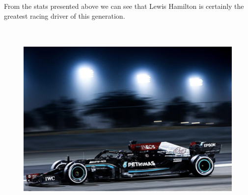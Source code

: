 \documentclass{article}
\begin{document}
From the stats presented above we can see that Lewis Hamilton is certainly the greatest racing driver of this generation.\\\\\\
\begin{figure}[h]
\centering
\includegraphics[scale=0.6]{car}
\caption{}
\label{fig:car}
\end{figure}

%
%
\end{document}
